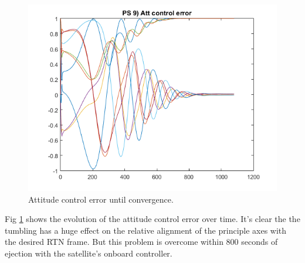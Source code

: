 \documentclass[12pt, letterpaper]{article}
\begin{document}
\begin{figure}[H]
	\centering
	\includegraphics[scale=0.9]{ps9_04}
	\caption{Attitude control error until convergence.}
	\label{9:atterror}
\end{figure}

Fig \ref{9:atterror} shows the evolution of the attitude control error over time. It's clear the the tumbling has a huge effect on the relative alignment of the principle axes with the desired RTN frame. But this problem is overcome within 800 seconds of ejection with the satellite's onboard controller.
\end{document}
